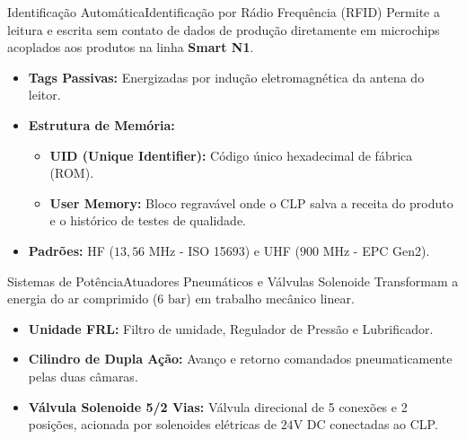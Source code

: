 \begin{senaiframe}{Identificação Automática}{Identificação por Rádio Frequência (RFID)}
  Permite a leitura e escrita sem contato de dados de produção diretamente em microchips acoplados aos produtos na linha \textbf{Smart N1}.

  \vspace{4pt}
  \begin{itemize}
    \item \textbf{Tags Passivas:} Energizadas por indução eletromagnética da antena do leitor.
    \item \textbf{Estrutura de Memória:}
      \begin{itemize}
        \item \textbf{UID (Unique Identifier):} Código único hexadecimal de fábrica (ROM).
        \item \textbf{User Memory:} Bloco regravável onde o CLP salva a receita do produto e o histórico de testes de qualidade.
      \end{itemize}
    \item \textbf{Padrões:} HF ($13,56\text{ MHz}$ - ISO 15693) e UHF ($900\text{ MHz}$ - EPC Gen2).
  \end{itemize}
\end{senaiframe}

\begin{senaiframe}{Sistemas de Potência}{Atuadores Pneumáticos e Válvulas Solenoide}
  Transformam a energia do ar comprimido ($6\text{ bar}$) em trabalho mecânico linear.

  \vspace{4pt}
  \begin{itemize}
    \item \textbf{Unidade FRL:} Filtro de umidade, Regulador de Pressão e Lubrificador.
    \item \textbf{Cilindro de Dupla Ação:} Avanço e retorno comandados pneumaticamente pelas duas câmaras.
    \item \textbf{Válvula Solenoide 5/2 Vias:} Válvula direcional de 5 conexões e 2 posições, acionada por solenoides elétricas de $24\text{V DC}$ conectadas ao CLP.
  \end{itemize}
\end{senaiframe}

